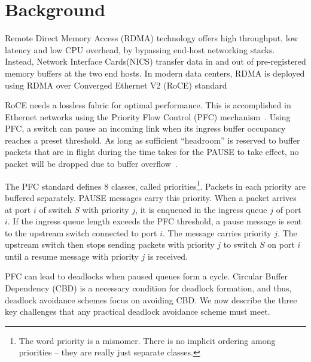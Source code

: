 \section{Background}
\label{sec:background}
 Remote Direct Memory Access (RDMA) technology offers high
throughput, low latency and low CPU overhead, by bypassing end-host networking
stacks. Instead, Network Interface Cards(NICS) transfer data in and out of
pre-registered memory buffers at the two end hosts.  In modern data centers,
RDMA is deployed using RDMA over Converged Ethernet V2 (RoCE)
standard~\cite{roce,rroce}

 RoCE needs a lossless fabric for optimal performance. This is
accomplished in Ethernet networks using the Priority Flow Control (PFC)
mechanism~\cite{pfc}.  Using PFC, a switch can pause an incoming link when its
ingress buffer occupancy reaches a preset threshold. As long as sufficient
``headroom'' is reserved to buffer packets that are in flight during the time
takes for the PAUSE to take effect, no packet will be dropped due to buffer
overflow~\cite{cisco-whitepaper,dcqcn}.

The PFC standard defines 8 classes, called priorities\footnote{The word priority
is a misnomer. There is no implicit ordering among priorities -- they are really
just separate classes.}. Packets in each priority are buffered separately.
PAUSE messages carry this priority.  When a packet arrives at port $i$ of switch
$S$ with priority $j$, it is enqueued in the ingress queue $j$ of port $i$. If the ingress queue
length exceeds the PFC threshold, a pause message is sent to the upstream
switch connected to port $i$. The message carries priority $j$. The upstream
switch then stops sending packets with priority $j$ to switch $S$ on port $i$
until a resume message with priority $j$ is received.

 PFC can lead to deadlocks when paused queues form a cycle.
Circular Buffer Dependency (CBD) is a necessary condition for
deadlock formation, and thus, deadlock avoidance schemes focus on
avoiding CBD.  We now describe the three key challenges that any
practical deadlock avoidance scheme must meet.
